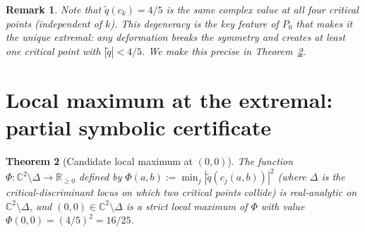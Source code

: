 \documentclass[11pt,a4paper]{article}
\newtheorem{theorem}{Theorem}[section]
\newtheorem{remark}[theorem]{Remark}
\begin{document}
\begin{remark}
Note that $\tilde{q}(c_k) = 4/5$ is the same complex value at all four critical points (independent of $k$). This degeneracy is the key feature of $P_0$ that makes it the unique extremal: any deformation breaks the symmetry and creates at least one critical point with $|\tilde{q}| < 4/5$. We make this precise in Theorem~\ref{thm:local-max}.
\end{remark}

\section{Local maximum at the extremal: partial symbolic certificate}

\begin{theorem}[Candidate local maximum at $(0, 0)$]\label{thm:local-max}
The function $\Phi: \mathbb{C}^2 \setminus \Delta \to \mathbb{R}_{\ge 0}$ defined by $\Phi(a, b) := \min_j |\tilde{q}(c_j(a, b))|^2$ (where $\Delta$ is the critical-discriminant locus on which two critical points collide) is real-analytic on $\mathbb{C}^2 \setminus \Delta$, and $(0, 0) \in \mathbb{C}^2 \setminus \Delta$ is a \emph{strict local maximum} of $\Phi$ with value $\Phi(0, 0) = (4/5)^2 = 16/25$.
\end{theorem}
\end{document}
